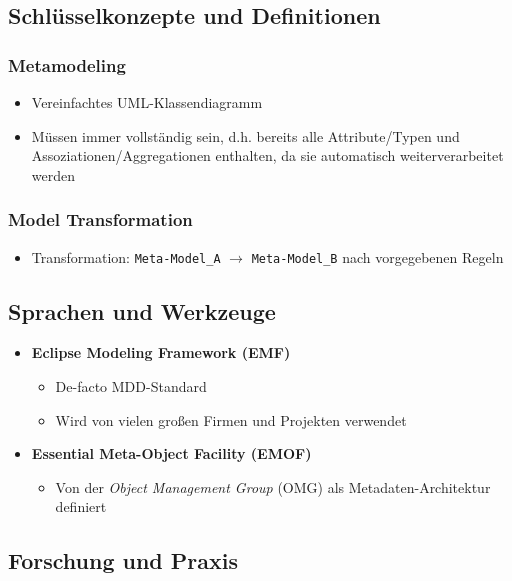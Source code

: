 \subsection{Schlüsselkonzepte und Definitionen}

\subsubsection{Metamodeling}
\begin{itemize}
	\item Vereinfachtes UML-Klassendiagramm
	\item Müssen immer vollständig sein, d.h. bereits alle Attribute/Typen und Assoziationen/Aggregationen enthalten, da sie automatisch weiterverarbeitet werden
\end{itemize}

\subsubsection{Model Transformation}
\begin{itemize}
	\item Transformation: \texttt{Meta-Model\_A} \(\longrightarrow\) \texttt{Meta-Model\_B} nach vorgegebenen Regeln
\end{itemize}


\subsection{Sprachen und Werkzeuge}
\begin{itemize}
	\item \textbf{Eclipse Modeling Framework (EMF)}
	\begin{itemize}
		\item De-facto MDD-Standard
		\item Wird von vielen großen Firmen und Projekten verwendet
	\end{itemize}
	\item \textbf{Essential Meta-Object Facility (EMOF)}
	\begin{itemize}
		\item Von der \textit{Object Management Group} (OMG) als Metadaten-Architektur definiert
	\end{itemize}
\end{itemize}



\subsection{Forschung und Praxis}



